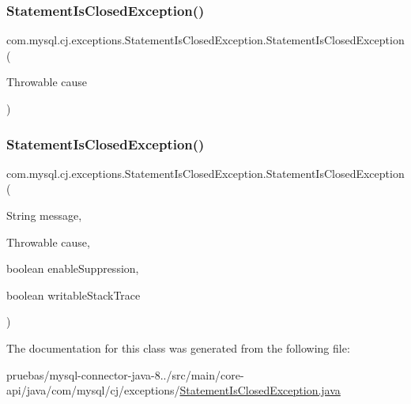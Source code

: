 \subsubsection{\texorpdfstring{Statement\+Is\+Closed\+Exception()}{StatementIsClosedException()}\hspace{0.1cm}{\footnotesize\ttfamily [4/5]}}
{\footnotesize\ttfamily com.\+mysql.\+cj.\+exceptions.\+Statement\+Is\+Closed\+Exception.\+Statement\+Is\+Closed\+Exception (\begin{DoxyParamCaption}\item[{Throwable}]{cause }\end{DoxyParamCaption})}

\mbox{\label{classcom_1_1mysql_1_1cj_1_1exceptions_1_1_statement_is_closed_exception_adef6f9b2bccc5d42ad620d9e5e2e2ed0}} 
\subsubsection{\texorpdfstring{Statement\+Is\+Closed\+Exception()}{StatementIsClosedException()}\hspace{0.1cm}{\footnotesize\ttfamily [5/5]}}
{\footnotesize\ttfamily com.\+mysql.\+cj.\+exceptions.\+Statement\+Is\+Closed\+Exception.\+Statement\+Is\+Closed\+Exception (\begin{DoxyParamCaption}\item[{String}]{message,  }\item[{Throwable}]{cause,  }\item[{boolean}]{enable\+Suppression,  }\item[{boolean}]{writable\+Stack\+Trace }\end{DoxyParamCaption})\hspace{0.3cm}{\ttfamily [protected]}}



The documentation for this class was generated from the following file\+:\begin{DoxyCompactItemize}
\item 
pruebas/mysql-\/connector-\/java-\/8../src/main/core-\/api/java/com/mysql/cj/exceptions/\mbox{\hyperlink{_statement_is_closed_exception_8java}{Statement\+Is\+Closed\+Exception.\+java}}\end{DoxyCompactItemize}

